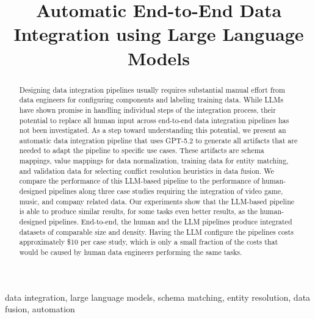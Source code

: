 \documentclass[conference]{IEEEtran}
\begin{document}
\title{Automatic End-to-End Data Integration using Large Language Models}



\author{
\and
{}
}

\maketitle

\begin{abstract}
Designing data integration pipelines usually requires substantial manual effort from data engineers for configuring components and labeling training data. While LLMs have shown promise in handling individual steps of the integration process, their potential to replace all human input across end-to-end data integration pipelines has not been investigated. As a step toward understanding this potential, we present an automatic data integration pipeline that uses GPT-5.2 to generate all artifacts that are needed to adapt the pipeline to specific use cases. These artifacts are schema mappings, value mappings for data normalization, training data for entity matching, and validation data for selecting conflict resolution heuristics in data fusion. We compare the performance of this LLM-based pipeline to the performance of human-designed pipelines along three case studies requiring the integration of video game, music, and company related data. Our experiments show that the LLM-based pipeline is able to produce similar results, for some tasks even better results, as the human-designed pipelines. End-to-end, the human and the LLM pipelines produce integrated datasets of comparable size and density. Having the LLM configure the pipelines costs approximately \$10 per case study, which is only a small fraction of the costs that would be caused by human data engineers performing the same tasks. 
\end{abstract}


\begin{IEEEkeywords}
data integration, large language models, schema matching, entity resolution, data fusion, automation
\end{IEEEkeywords}













\end{document}
